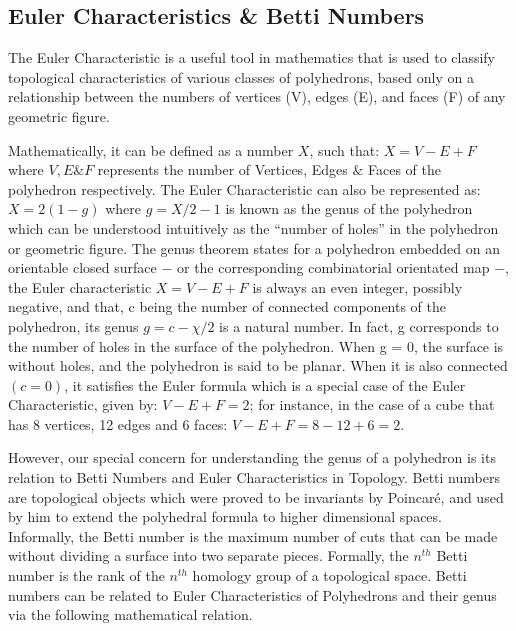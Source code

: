 \subsection{Euler Characteristics \& Betti Numbers}

The Euler Characteristic is a useful tool in mathematics that is used to classify topological characteristics of various classes of polyhedrons, based only on a relationship between the numbers of vertices (V), edges (E), and faces (F) of any geometric figure.\cite{07.2_TopoBettiNumbers}

Mathematically, it can be defined as a number $X$, such that: $X = V - E + F$ where $V, E \& F$ represents the number of Vertices, Edges $\&$ Faces of the polyhedron respectively. The Euler Characteristic can also be represented as: $X =2(1-g)$ where  $g= X/2-1$ is known as the genus  of the polyhedron \cite{17.2_TGTonlineBritanica} which can be understood intuitively as the “number of holes” in the polyhedron or geometric figure. The genus theorem states for a polyhedron embedded on an orientable closed surface − or the corresponding combinatorial orientated map −, the Euler characteristic  $X = V − E + F$ is always an even integer, possibly negative, and that, c being the number of connected components of the polyhedron, its genus $g = c − \chi/2$ is a natural number. In fact, g corresponds to the number of holes in the surface of the polyhedron. When g = 0, the surface is without holes, and the polyhedron is said to be planar. When it is also connected $(c = 0)$, it satisfies the Euler formula which is a special case of the Euler Characteristic, given by:  $V−E+F= 2$; for instance, in the case of a cube that has 8 vertices, 12 edges and 6 faces: $V−E + F=8-12+6=2$.\cite{03_1944Homology} \cite{01.18_EulerFormula}

However, our special concern for understanding the genus of a polyhedron is its relation to Betti Numbers and  Euler Characteristics in Topology. Betti numbers are topological objects which were proved to be invariants by Poincaré, and used by him to extend the polyhedral formula to higher dimensional spaces. Informally, the Betti number is the maximum number of cuts that can be made without dividing a surface into two separate pieces. Formally, the $n^{th}$ Betti number is the rank of the $n^{th}$ homology group of a topological space. Betti numbers can be related to Euler Characteristics of Polyhedrons and their genus via the following mathematical relation.\cite{03.7_2018homologicalAlgebra&Data} \cite{07.3_BettiNumber} \cite{07.2_TopoBettiNumbers}

